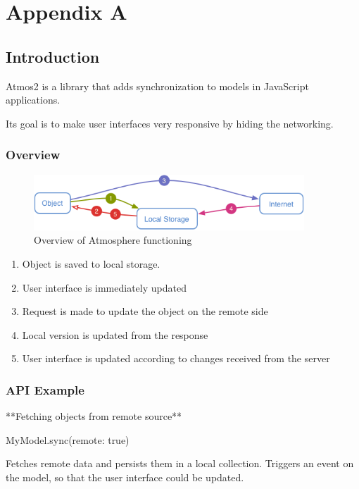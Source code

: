 \section*{Appendix A}

\subsection{Introduction}

Atmos2 is a library that adds synchronization to models in JavaScript applications. 

Its goal is to make user interfaces very responsive by hiding the networking. 

\subsubsection{Overview}

\begin{figure}[htbp]
  \centering
    \includegraphics[width=4in]{figures/atmos-02.png}
  \caption{Overview of Atmosphere functioning}
  \label{fig:figures_atmos-02}
\end{figure}

\begin{enumerate}
\item Object is saved to local storage. 
\item User interface is immediately updated
\item Request is made to update the object on the remote side
\item Local version is updated from the response
\item User interface is updated according to changes received from the server
\end{enumerate}



\subsubsection{API Example}

**Fetching objects from remote source**

    MyModel.sync(remote: true)

Fetches remote data and persists them in a local collection. Triggers an event on the model, so that the user interface could be updated.

